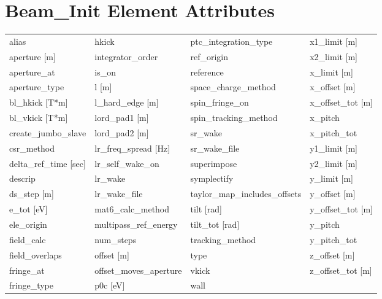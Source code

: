  \section{Beam_Init Element Attributes}
 \label{s:list.beam.init}
 
 \begin{tabular}{llll} \toprule
alias                          & hkick                          & ptc_integration_type           & x1_limit [m]                   \\
aperture [m]                   & integrator_order               & ref_origin                     & x2_limit [m]                   \\
aperture_at                    & is_on                          & reference                      & x_limit [m]                    \\
aperture_type                  & l [m]                          & space_charge_method            & x_offset [m]                   \\
bl_hkick [T*m]                 & l_hard_edge [m]                & spin_fringe_on                 & x_offset_tot [m]               \\
bl_vkick [T*m]                 & lord_pad1 [m]                  & spin_tracking_method           & x_pitch                        \\
create_jumbo_slave             & lord_pad2 [m]                  & sr_wake                        & x_pitch_tot                    \\
csr_method                     & lr_freq_spread [Hz]            & sr_wake_file                   & y1_limit [m]                   \\
delta_ref_time [sec]           & lr_self_wake_on                & superimpose                    & y2_limit [m]                   \\
descrip                        & lr_wake                        & symplectify                    & y_limit [m]                    \\
ds_step [m]                    & lr_wake_file                   & taylor_map_includes_offsets    & y_offset [m]                   \\
e_tot [eV]                     & mat6_calc_method               & tilt [rad]                     & y_offset_tot [m]               \\
ele_origin                     & multipass_ref_energy           & tilt_tot [rad]                 & y_pitch                        \\
field_calc                     & num_steps                      & tracking_method                & y_pitch_tot                    \\
field_overlaps                 & offset [m]                     & type                           & z_offset [m]                   \\
fringe_at                      & offset_moves_aperture          & vkick                          & z_offset_tot [m]               \\
fringe_type                    & p0c [eV]                       & wall                           &                                \\
 \bottomrule
 \end{tabular}
